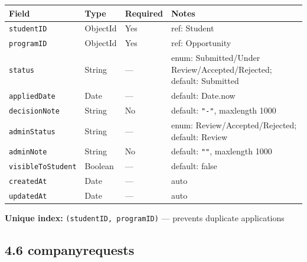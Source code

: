 \documentclass[12pt,a4paper]{article}
\begin{document}
\begin{longtable}{p{3.5cm}p{2.5cm}p{1.8cm}p{5.5cm}}
  \toprule
  \textbf{Field} & \textbf{Type} & \textbf{Required} & \textbf{Notes} \\
  \midrule
  \texttt{studentID}      & ObjectId & Yes & ref: Student \\
  \texttt{programID}      & ObjectId & Yes & ref: Opportunity \\
  \texttt{status}         & String   & — & enum: Submitted/Under Review/Accepted/Rejected; default: Submitted \\
  \texttt{appliedDate}    & Date     & — & default: Date.now \\
  \texttt{decisionNote}   & String   & No & default: \texttt{"-"}, maxlength 1000 \\
  \texttt{adminStatus}    & String   & — & enum: Review/Accepted/Rejected; default: Review \\
  \texttt{adminNote}      & String   & No & default: \texttt{""}, maxlength 1000 \\
  \texttt{visibleToStudent} & Boolean & — & default: false \\
  \texttt{createdAt}      & Date     & — & auto \\
  \texttt{updatedAt}      & Date     & — & auto \\
  \bottomrule
\end{longtable}

\noindent\textbf{Unique index:} \texttt{(studentID, programID)} — prevents duplicate applications

\subsection*{4.6 companyrequests}
\end{document}
